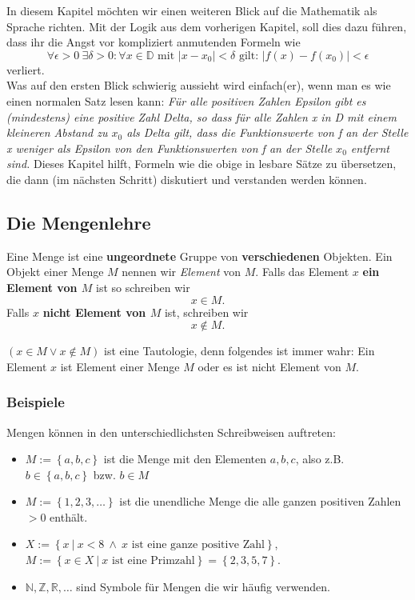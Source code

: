 In diesem Kapitel möchten wir einen weiteren Blick auf die Mathematik als Sprache richten. Mit der Logik aus dem vorherigen Kapitel, soll dies dazu führen, dass ihr die Angst vor kompliziert anmutenden Formeln wie
\begin{equation*}
\forall \epsilon > 0 \ \exists \delta > 0 : \forall x \in \mathbb{D} \text{ mit } \left|x - x_0 \right| < \delta \text{ gilt: } \left| f(x) - f(x_0) \right| < \epsilon 
\end{equation*}
verliert.\\
Was auf den ersten Blick schwierig aussieht wird einfach(er), wenn man es wie einen normalen Satz lesen kann:
\textit{
Für alle positiven Zahlen Epsilon gibt es (mindestens) eine positive Zahl Delta, so dass für alle Zahlen x in D mit einem kleineren Abstand zu $x_0$ als Delta gilt, dass die Funktionswerte von f an der Stelle x weniger als Epsilon von den Funktionswerten von f an der Stelle $x_0$ entfernt sind.
}
Dieses Kapitel hilft, Formeln wie die obige in lesbare Sätze zu übersetzen, die dann (im nächsten Schritt) diskutiert und verstanden werden können.

\subsection{Die Mengenlehre}
Eine Menge ist eine \textbf{ungeordnete} Gruppe von \textbf{verschiedenen} Objekten. Ein Objekt einer Menge $M$ nennen wir \textit{Element} von $M$. Falls das Element $x$ \textbf{ein Element von $M$} ist so schreiben wir 
\begin{equation*}
x \in M.
\end{equation*}
Falls $x$ \textbf{nicht Element von $M$} ist, schreiben wir
\begin{equation*}
x \notin M.
\end{equation*}

\begin{warning}
	$(x \in M \lor x \notin M)$ ist eine Tautologie, denn folgendes ist immer wahr: Ein Element $x$ ist Element einer Menge $M$ oder es ist nicht Element von $M$.
\end{warning}

\subsubsection{Beispiele}
Mengen können in den unterschiedlichsten Schreibweisen auftreten:
\begin{itemize}
\item $M := \left\{a, b, c\right\}$ ist die Menge mit den Elementen $a,b,c$, also z.B. $b \in  \left\{a, b, c\right\}$ bzw. $b \in M$
\item $M := \left\{1, 2, 3, \ldots \right\}$ ist die unendliche Menge die alle ganzen positiven Zahlen $> 0$ enthält.
\item $X:= \left\{x \ | \ x < 8 \ \land \ x \text{ ist eine ganze positive Zahl} \right\}$,\\$M := \left\{x \in X \ | \ x \text{ ist eine Primzahl} \right\} = \left\{2, 3, 5, 7\right\}$.
\item $\mathbb{N}, \mathbb{Z}, \mathbb{R}, \ldots$ sind Symbole für Mengen die wir häufig verwenden.
\end{itemize}

